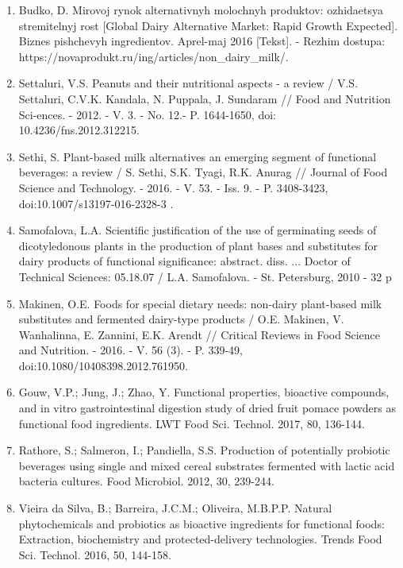 \begin{enumerate}
\item
Bud\textquotesingle ko, D. Mirovoj rynok
al\textquotesingle ternativnyh molochnyh produktov: ozhidaetsya
stremitel\textquotesingle nyj rost {[}Global Dairy Alternative Market:
Rapid Growth Expected{]}. Biznes pishchevyh ingredientov.
Aprel\textquotesingle-maj 2016 {[}Tekst{]}. - Rezhim dostupa:
https://novaprodukt.ru/ing/articles/non\_dairy\_milk/.

\item
Settaluri, V.S. Peanuts and their nutritional aspects - a review /
V.S. Settaluri, C.V.K. Kandala, N. Puppala, J. Sundaram // Food and
Nutrition Sci-ences. - 2012. - V. 3. - No. 12.- P. 1644-1650, doi:
10.4236/fns.2012.312215.

\item
Sethi, S. Plant-based milk alternatives an emerging segment of
functional beverages: a review / S. Sethi, S.K. Tyagi, R.K. Anurag //
Journal of Food Science and Technology. - 2016. - V. 53. - Iss. 9. -
P. 3408-3423, doi:10.1007/s13197-016-2328-3 .

\item
Samofalova, L.A. Scientific justification of the use of germinating
seeds of dicotyledonous plants in the production of plant bases and
substitutes for dairy products of functional significance: abstract.
diss. ... Doctor of Technical Sciences: 05.18.07 / L.A. Samofalova. -
St. Petersburg, 2010 - 32 p

\item
Makinen, O.E. Foods for special dietary needs: non-dairy plant-based
milk substitutes and fermented dairy-type products / O.E. Makinen, V.
Wanhalinna, E. Zannini, E.K. Arendt // Critical Reviews in Food Science
and Nutrition. - 2016. - V. 56 (3). - P. 339-49,
doi:10.1080/10408398.2012.761950.

\item
Gouw, V.P.; Jung, J.; Zhao, Y. Functional properties, bioactive
compounds, and in vitro gastrointestinal digestion study of dried fruit
pomace powders as functional food ingredients. LWT Food Sci. Technol.
2017, 80, 136-144.

\item
Rathore, S.; Salmeron, I.; Pandiella, S.S. Production of potentially
probiotic beverages using single and mixed cereal substrates fermented
with lactic acid bacteria cultures. Food Microbiol. 2012, 30, 239-244.

\item
Vieira da Silva, B.; Barreira, J.C.M.; Oliveira, M.B.P.P. Natural
phytochemicals and probiotics as bioactive ingredients for functional
foods: Extraction, biochemistry and protected-delivery technologies.
Trends Food Sci. Technol. 2016, 50, 144-158.


\end{enumerate}
